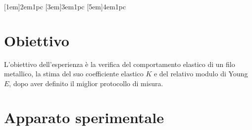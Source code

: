 \documentclass[a4paper,11pt,oneside]{article}
\begin{document}


\tableofcontents
{}
\contentsmargin{6em}
[1em]{\bigskip}{2em}{1pc}
[3em]{\smallskip}{3em}{1pc}
[5em]{\smallskip}{4em}{1pc}


\newpage

\section{Obiettivo}
L'obiettivo dell'esperienza è la verifica del comportamento elastico di un filo metallico, la stima del suo coefficiente elastico $K$ e del relativo modulo di Young $E$, dopo aver definito il miglior protocollo di misura.

\section{Apparato sperimentale}\label{section:apparato}
\end{document}
